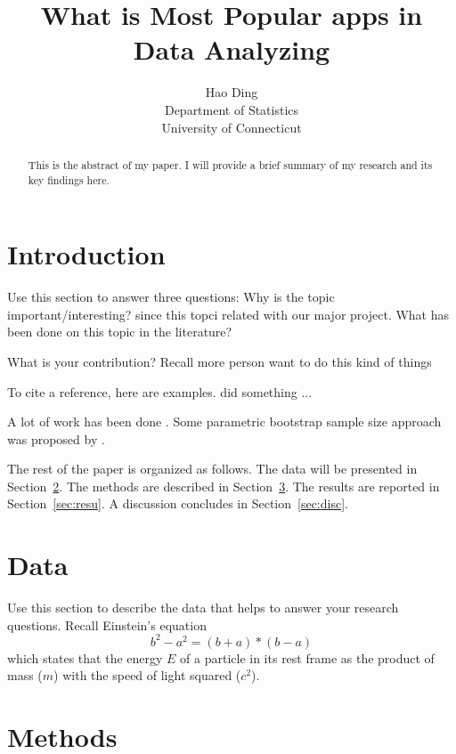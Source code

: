 \documentclass[12pt]{article}
\title{What is Most Popular apps in Data Analyzing}
\author{Hao Ding\\
  Department of Statistics\\
  University of Connecticut
}
\begin{document}
\maketitle

\begin{abstract}
  This is the abstract of my paper. I will provide a brief summary of my research and its key findings here.
\end{abstract}


\section{Introduction}
\label{sec:intro}

Use this section to answer three questions:
Why is the topic important/interesting?
since this topci related with our major project. 
What has been done on this topic in the literature?

What is your contribution?
Recall more person want to do this kind of things

\lipsum[1-3]

To cite a reference, here are examples.
\citet{pires2021teens} did something ... \lipsum[1]

A lot of work has been done \citep[e.g.,][]{dongarra1987computer,
}.
\lipsum[2]
Some parametric bootstrap sample size approach was proposed by
\citet{khaitovich2023most}. 


The rest of the paper is organized as follows.
The data will be presented in Section~\ref{sec:data}.
The methods are described in Section~\ref{sec:meth}.
The results are reported in Section~\ref{sec:resu}.
A discussion concludes in Section~\ref{sec:disc}.


\section{Data}
\label{sec:data}

Use this section to describe the data that helps to answer your research
questions. Recall Einstein's equation
\begin{equation}
  \label{eq:mc2}
  b^2 - a^2 = (b+a) * (b-a)
\end{equation}
which states that the energy $E$ of a particle in its rest frame as the product
of mass ($m$) with the speed of light squared ($c^2$).

\section{Methods}
\label{sec:meth}
\end{document}
